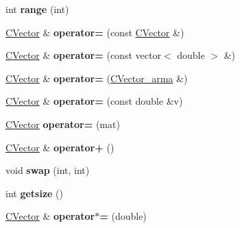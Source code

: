 \begin{DoxyCompactItemize}
\item 
\mbox{\label{class_c_vector_ac85cb6dcf86a878f347c9173f447eed8}} 
int {\bfseries range} (int)
\item 
\mbox{\label{class_c_vector_aa0bada9449f4ed9d6a2f974b7b86424a}} 
\hyperlink{class_c_vector}{C\+Vector} \& {\bfseries operator=} (const \hyperlink{class_c_vector}{C\+Vector} \&)
\item 
\mbox{\label{class_c_vector_aa9a8e7693789f5fd3234e994aeeab1ae}} 
\hyperlink{class_c_vector}{C\+Vector} \& {\bfseries operator=} (const vector$<$ double $>$ \&)
\item 
\mbox{\label{class_c_vector_a8f5964061a51caada3dcc556800a21a5}} 
\hyperlink{class_c_vector}{C\+Vector} \& {\bfseries operator=} (\hyperlink{class_c_vector__arma}{C\+Vector\+\_\+arma} \&)
\item 
\mbox{\label{class_c_vector_a0e103eefc751160802a1a14609c7fb69}} 
\hyperlink{class_c_vector}{C\+Vector} \& {\bfseries operator=} (const double \&v)
\item 
\mbox{\label{class_c_vector_ac940d371b626e300241347208b1b4ddb}} 
\hyperlink{class_c_vector}{C\+Vector} {\bfseries operator=} (mat)
\item 
\mbox{\label{class_c_vector_ab99ff660398ff22231d9b1b27b52775e}} 
\hyperlink{class_c_vector}{C\+Vector} \& {\bfseries operator+} ()
\item 
\mbox{\label{class_c_vector_a4d6d240ce429cd73cab471f4a2cf7536}} 
void {\bfseries swap} (int, int)
\item 
\mbox{\label{class_c_vector_a9ac4e4ede9dad83add969d1ebe13b49c}} 
int {\bfseries getsize} ()
\item 
\mbox{\label{class_c_vector_a0fbb989f8dbde02ac0ffa74322542bf0}} 
\hyperlink{class_c_vector}{C\+Vector} \& {\bfseries operator$\ast$=} (double)
\item 
\mbox{\label{class_c_vector_a3893e700b22ed778a33687634b01f830}} 

\end{DoxyCompactItemize}
